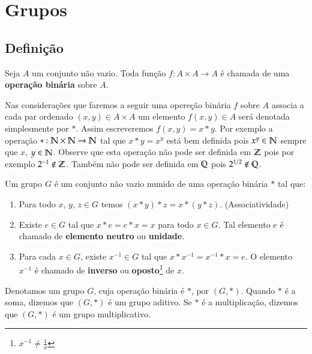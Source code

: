 \chapter{Grupos}

\section{Defini{\c c}{\~a}o}

\begin{definicao}
   Seja $A$ um conjunto n\~ao vazio. Toda fun\c{c}\~ao $f : A \times A \to A$ \'e chamada de uma \textbf{opera\c{c}\~ao bin\'aria} sobre $A$.
\end{definicao}

Nas considera\c{c}\~oes que faremos a seguir uma opere\c{c}\~ao bin\'aria $f$ sobre $A$ associa a cada par ordenado $(x, y) \in A \times A$ um elemento $f(x, y) \in A$ ser\'a denotada simplesmente por $*$. Assim escreveremos $f(x, y) = x*y$. Por exemplo a opera\c{c}\~ao $* : \mathbb{N} \times \mathbb{N} \to \mathbb{N}$ tal que $x*y = x^y$ est\'a bem definida pois $x^y \in \mathbb{N}$ sempre que $x$, $y \in \mathbb{N}$. Observe que esta opera\c{c}\~ao n\~ao pode ser definida em $\mathbb{Z}$ pois por exemplo $2^{-1} \notin \mathbb{Z}$. Tamb\'em n\~ao pode ser definida em $\mathbb{Q}$ pois $2^{1/2} \notin \mathbb{Q}$.

\begin{definicao}[Grupo] Um grupo $G$ {\'e} um conjunto n{\~a}o vazio munido de uma opera{\c c}{\~a}o bin{\'a}ria $*$ tal que:
\begin{enumerate}
\item Para todo $x$, $y$, $z\in G$ temos $(x*y)*z=x*(y*z)$. (Associatividade)
\item Existe $e\in G$ tal que $x*e = e*x = x$ para todo $x\in G$. Tal elemento $e$ {\'e} chamado de \textbf{elemento neutro} ou \textbf{unidade}.
\item Para cada $x\in G$, existe $x^{-1}\in G$ tal que $x*x^{-1} = x^{-1}*x = e$. O elemento $x^{-1}$ {\'e} chamado de \textbf{inverso} ou \textbf{oposto}\footnote{$x^{-1}\neq\displaystyle\frac{1}{x}$} de $x$.
\end{enumerate}
\end{definicao}

Denotamos um grupo $G$, cuja opera{\c c}{\~a}o bin{\'a}ria {\'e} $*$, por $(G,*)$. Quando $*$ {\'e} a soma, dizemos que $(G,*)$ {\'e} um grupo aditivo. Se $*$ {\'e} a multiplica{\c c}{\~a}o, dizemos que $(G,*)$ {\'e} um grupo multiplicativo.\\

